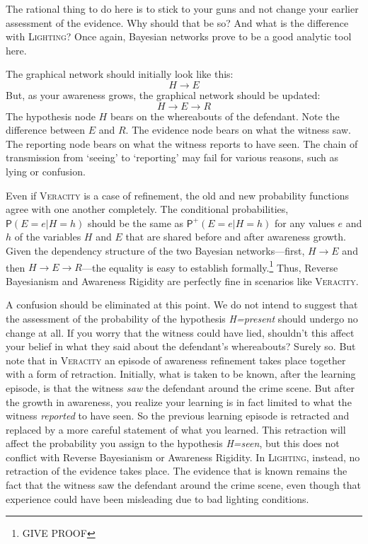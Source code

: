 \documentclass[
  11pt,
  dvipsnames,enabledeprecatedfontcommands]{scrartcl}
\newcommand{\pr}[1]{\ensuremath{\mathsf{P}(#1)}}
\newcommand{\ppr}[2]{\ensuremath{\mathsf{P}^{#1}(#2)}}
\begin{document}
\noindent   The rational thing to do here is to stick to your guns and
not change your earlier assessment of the evidence. Why should that be
so? And what is the difference with \textsc{Lighting}? Once again,
Bayesian networks prove to be a good analytic tool here.

The graphical network should initially look like this:
\[H\rightarrow E\] But, as your awareness grows, the graphical network
should be updated: \[H\rightarrow E \rightarrow R\] The hypothesis node
\(H\) bears on the whereabouts of the defendant. Note the difference
between \(E\) and \(R\). The evidence node bears on what the witness
saw. The reporting node bears on what the witness reports to have seen.
The chain of transmission from `seeing' to `reporting' may fail for
various reasons, such as lying or confusion.

Even if \textsc{Veracity} is a case of refinement, the old and new
probability functions agree with one another completely. The conditional
probabilities, \(\pr{E=e \vert H=h}\) should be the same as
\(\ppr{+}{E=e \vert H=h}\) for any values \(e\) and \(h\) of the
variables \(H\) and \(E\) that are shared before and after awareness
growth. Given the dependency structure of the two Bayesian
networks---first, \(H\rightarrow E\) and then
\(H\rightarrow E \rightarrow R\)---the equality is easy to establish
formally.\footnote{GIVE PROOF} Thus, Reverse Bayesianism and Awareness
Rigidity are perfectly fine in scenarios like \textsc{Veracity}.

A confusion should be eliminated at this point. We do not intend to
suggest that the assessment of the probability of the hypothesis
\textit{H=present} should undergo no change at all. If you worry that
the witness could have lied, shouldn't this affect your belief in what
they said about the defendant's whereabouts? Surely so. But note that in
\textsc{Veracity} an episode of awareness refinement takes place
together with a form of retraction. Initially, what is taken to be
known, after the learning episode, is that the witness \textit{saw} the
defendant around the crime scene. But after the growth in awareness, you
realize your learning is in fact limited to what the witness
\textit{reported} to have seen. So the previous learning episode is
retracted and replaced by a more careful statement of what you learned.
This retraction will affect the probability you assign to the hypothesis
\textit{H=seen}, but this does not conflict with Reverse Bayesianism or
Awareness Rigidity. In \textsc{Lighting}, instead, no retraction of the
evidence takes place. The evidence that is known remains the fact that
the witness saw the defendant around the crime scene, even though that
experience could have been misleading due to bad lighting conditions.
\end{document}

